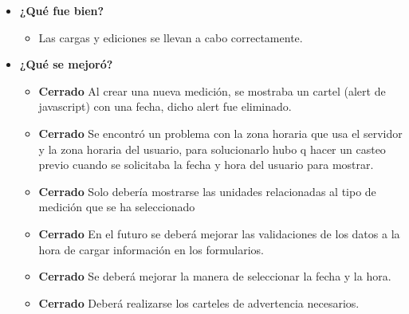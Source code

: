 	\begin{itemize}
		\item \textbf{¿Qué fue bien?}
        	\begin{itemize}
				\item        Las cargas y ediciones se llevan a cabo correctamente.
			\end{itemize}

   		\item \textbf{¿Qué se mejoró?}
        	\begin{itemize}
				\item \textbf{Cerrado} Al crear una nueva medición, se mostraba un cartel (alert de javascript) con una fecha, dicho alert fue eliminado.
                \item \textbf{Cerrado} Se encontró un problema con la zona horaria que usa el servidor y la zona horaria del usuario, para solucionarlo hubo q hacer un casteo previo cuando se solicitaba la fecha y hora del usuario para mostrar.
			\end{itemize}

        	\begin{itemize}
		        \item \textbf{Cerrado} Solo debería mostrarse las unidades relacionadas al tipo de medición que se ha seleccionado 
				\item \textbf{Cerrado} En el futuro se deberá mejorar las validaciones de los datos a la hora de cargar información en los formularios.
        		\item \textbf{Cerrado} Se deberá mejorar la manera de seleccionar la fecha y la hora. 
                \item \textbf{Cerrado} Deberá realizarse los carteles de advertencia necesarios.
            \end{itemize}
       
	\end{itemize}